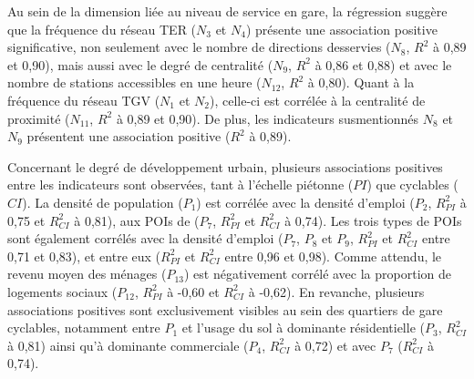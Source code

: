 \begin{refsegment}
Au sein de la dimension liée au niveau de service en gare, la régression suggère que la fréquence du réseau \acrshort{TER} (\(N_{3}\) et \(N_{4}\)) présente une association positive significative, non seulement avec le nombre de directions desservies (\(N_{8}\), \(R^{2}\) à 0,89 et 0,90), mais aussi avec le degré de centralité (\(N_{9}\), \(R^{2}\) à 0,86 et 0,88) et avec le nombre de stations accessibles en une heure (\(N_{12}\), \(R^{2}\) à 0,80). Quant à la fréquence du réseau \acrshort{TGV} (\(N_{1}\) et \(N_{2}\)), celle-ci est corrélée à la centralité de proximité (\(N_{11}\), \(R^{2}\) à 0,89 et 0,90). De plus, les indicateurs susmentionnés \(N_{8}\) et \(N_{9}\) présentent une association positive (\(R^{2}\) à 0,89).%

Concernant le degré de développement urbain, plusieurs associations positives entre les indicateurs sont observées, tant à l'échelle piétonne (\(PI\)) que cyclables (\(CI\)). La densité de population (\(P_{1}\)) est corrélée avec la densité d'emploi (\(P_{2}\), \(R^{2}_{PI}\) à 0,75 et \(R^{2}_{CI}\) à 0,81), aux \acrshort{POIs} de  (\(P_{7}\), \(R^{2}_{PI}\) et \(R^{2}_{CI}\) à 0,74). Les trois types de \acrshort{POIs} sont également corrélés avec la densité d'emploi (\(P_{7}\), \(P_{8}\) et \(P_{9}\), \(R^{2}_{PI}\) et \(R^{2}_{CI}\) entre 0,71 et 0,83), et entre eux (\(R^{2}_{PI}\) et \(R^{2}_{CI}\) entre 0,96 et 0,98). Comme attendu, le revenu moyen des ménages (\(P_{13}\)) est négativement corrélé avec la proportion de logements sociaux (\(P_{12}\), \(R^{2}_{PI}\) à -0,60 et \(R^{2}_{CI}\) à -0,62). En revanche, plusieurs associations positives sont exclusivement visibles au sein des quartiers de gare cyclables, notamment entre \(P_{1}\) et l'usage du sol à dominante résidentielle (\(P_{3}\), \(R^{2}_{CI}\) à 0,81) ainsi qu'à dominante commerciale (\(P_{4}\), \(R^{2}_{CI}\) à 0,72) et avec \(P_{7}\) (\(R^{2}_{CI}\) à 0,74).%


\end{refsegment}
